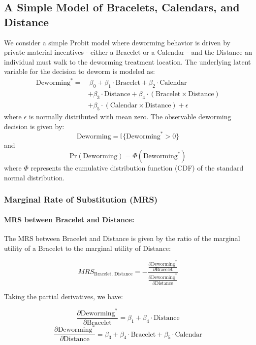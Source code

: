 \documentclass{article}
\title{}
\author{}
\date{}
\begin{document}
\maketitle


\subsection{A Simple Model of Bracelets, Calendars, and Distance}
We consider a simple Probit model where deworming behavior is driven by private material incentives - either a Bracelet or a Calendar - and the Distance an individual must walk to the deworming treatment location. The underlying latent variable for the decision to deworm is modeled as:
\[
\begin{aligned}
\text{Deworming}^* = & \ \beta_0 + \beta_1 \cdot \text{Bracelet} + \beta_2 \cdot \text{Calendar} \\
& + \beta_3 \cdot \text{Distance} + \beta_4 \cdot (\text{Bracelet} \times \text{Distance}) \\
& + \beta_5 \cdot (\text{Calendar} \times \text{Distance}) + \epsilon
\end{aligned}
\]
where $\epsilon$ is normally distributed with mean zero. The observable deworming decision is given by:
\[
\text{Deworming} = \mathbb{I}\{\text{Deworming}^* > 0\}
\]
and
\[
\text{Pr}(\text{Deworming}) = \Phi(\text{Deworming}^*)
\]
where $\Phi$ represents the cumulative distribution function (CDF) of the standard normal distribution.

\subsubsection*{Marginal Rate of Substitution (MRS)}

\paragraph{MRS between Bracelet and Distance:}

The MRS between Bracelet and Distance is given by the ratio of the marginal utility of a Bracelet to the marginal utility of Distance:

\[
MRS_{\text{Bracelet, Distance}} = -\frac{\frac{\partial \text{Deworming}^*}{\partial \text{Bracelet}}}{\frac{\partial \text{Deworming}^*}{\partial \text{Distance}}}
\]

Taking the partial derivatives, we have:

\[
\frac{\partial \text{Deworming}^*}{\partial \text{Bracelet}} = \beta_1 + \beta_4 \cdot \text{Distance}
\]
\[
\frac{\partial \text{Deworming}^*}{\partial \text{Distance}} = \beta_3 + \beta_4 \cdot \text{Bracelet} + \beta_5 \cdot \text{Calendar}
\]
\end{document}
